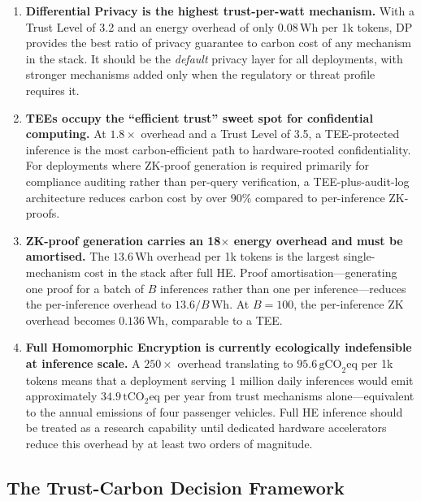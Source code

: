 \begin{enumerate}
  \item \textbf{Differential Privacy is the highest
    trust-per-watt mechanism.}
    With a Trust Level of 3.2 and an energy overhead of only
    $0.08\,\text{Wh}$ per 1k tokens, DP provides the best
    ratio of privacy guarantee to carbon cost of any mechanism
    in the stack.
    It should be the \emph{default} privacy layer for all
    deployments, with stronger mechanisms added only when the
    regulatory or threat profile requires it.

  \item \textbf{TEEs occupy the ``efficient trust'' sweet spot
    for confidential computing.}
    At $1.8\times$ overhead and a Trust Level of 3.5, a
    TEE-protected inference is the most carbon-efficient path
    to hardware-rooted confidentiality.
    For deployments where ZK-proof generation is required
    primarily for compliance auditing rather than per-query
    verification, a TEE-plus-audit-log architecture
    reduces carbon cost by over $90\%$ compared to per-inference
    ZK-proofs.

  \item \textbf{ZK-proof generation carries an 18$\times$ energy
    overhead and must be amortised.}
    The $13.6\,\text{Wh}$ overhead per 1k tokens is the
    largest single-mechanism cost in the stack after full HE.
    Proof amortisation---generating one proof for a batch of
    $B$ inferences rather than one per inference---reduces the
    per-inference overhead to $13.6 / B\,\text{Wh}$.
    At $B = 100$, the per-inference ZK overhead becomes
    $0.136\,\text{Wh}$, comparable to a TEE.

  \item \textbf{Full Homomorphic Encryption is currently
    ecologically indefensible at inference scale.}
    A $250\times$ overhead translating to $95.6\,\text{gCO}_2\text{eq}$
    per 1k tokens means that a deployment serving 1 million
    daily inferences would emit approximately
    $34.9\,\text{tCO}_2\text{eq}$ per year from trust mechanisms
    alone---equivalent to the annual emissions of four
    passenger vehicles.
    Full HE inference should be treated as a research
    capability until dedicated hardware accelerators reduce
    this overhead by at least two orders of magnitude.
\end{enumerate}

\subsection{The Trust-Carbon Decision Framework}
\label{subsec:trust-carbon-decision}

